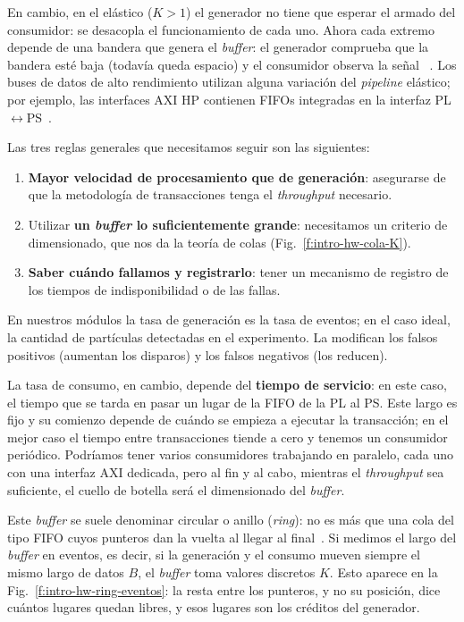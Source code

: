 En cambio, en el elástico ($K>1$) el generador no tiene que esperar el armado
del consumidor: se desacopla el funcionamiento de cada uno. Ahora cada extremo
depende de una bandera que genera el \emph{buffer}: el generador comprueba que la
bandera  esté baja (todavía queda espacio) y el consumidor observa
la señal ~\cite{Cummings2002}. Los buses de datos de alto
rendimiento utilizan alguna variación del \emph{pipeline} elástico; por ejemplo, las
interfaces AXI HP contienen FIFOs integradas en la interfaz
PL$\leftrightarrow$PS~\cite{UG585}.

Las tres reglas generales que necesitamos seguir son las siguientes:
\begin{enumerate}
  \item \textbf{Mayor velocidad de procesamiento que de generación}: asegurarse
    de que la metodología de transacciones tenga el \emph{throughput} necesario.
  \item Utilizar \textbf{un \emph{buffer} lo suficientemente grande}: necesitamos un
    criterio de dimensionado, que nos da la teoría de colas
    (Fig.~\ref{f:intro-hw-cola-K}).
  \item \textbf{Saber cuándo fallamos y registrarlo}: tener un mecanismo de
    registro de los tiempos de indisponibilidad o de las fallas.
\end{enumerate}

En nuestros módulos la tasa de generación es la tasa de eventos; en el caso
ideal, la cantidad de partículas detectadas en el experimento. La modifican los
falsos positivos (aumentan los disparos) y los falsos negativos (los reducen).

La tasa de consumo, en cambio, depende del \textbf{tiempo de servicio}: en este
caso, el tiempo que se tarda en pasar un lugar de la FIFO de la PL al PS. Este
largo es fijo y su comienzo depende de cuándo se empieza a ejecutar la
transacción; en el mejor caso el tiempo entre transacciones tiende a cero y
tenemos un consumidor periódico. Podríamos tener varios consumidores trabajando
en paralelo, cada uno con una interfaz AXI dedicada, pero al fin y al cabo,
mientras el \emph{throughput} sea suficiente, el cuello de botella será el dimensionado
del \emph{buffer}.

Este \emph{buffer} se suele denominar circular o anillo (\emph{ring}): no es más que
una cola del tipo FIFO cuyos punteros dan la vuelta al llegar al
final~\cite{Cummings2002}. Si medimos el largo del \emph{buffer} en eventos, es decir,
si la generación y el consumo mueven siempre el mismo largo de datos $B$, el
\emph{buffer} toma valores discretos $K$. Esto aparece en la
Fig.~\ref{f:intro-hw-ring-eventos}: la resta entre los punteros, y no su
posición, dice cuántos lugares quedan libres, y esos lugares son los créditos
del generador.

